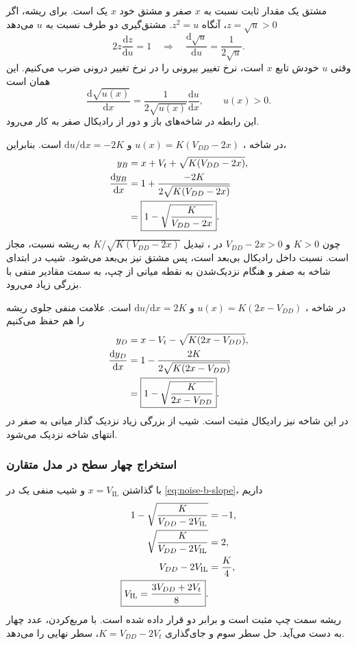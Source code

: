 مشتق یک مقدار ثابت نسبت به \(x\) صفر و مشتق خود \(x\) یک است.
برای ریشه، اگر \(z=\sqrt{u}>0\)، آنگاه \(z^2=u\).
مشتق‌گیری دو طرف نسبت به \(u\) می‌دهد
\[
 2z\frac{\mathrm{d}z}{\mathrm{d}u}=1
 \quad\Longrightarrow\quad
 \frac{\mathrm{d}\sqrt{u}}{\mathrm{d}u}=\frac{1}{2\sqrt{u}}.
\]
وقتی \(u\) خودش تابع \(x\) است، نرخ تغییر بیرونی را در نرخ
تغییر درونی ضرب می‌کنیم. این همان  است
\begin{equation}
 \frac{\mathrm{d}\sqrt{u(x)}}{\mathrm{d}x}
 =\frac{1}{2\sqrt{u(x)}}\frac{\mathrm{d}u}{\mathrm{d}x},
 \qquad u(x)>0.
 \label{eq:noise-chain-rule}
\end{equation}
این رابطه در شاخه‌های باز و دور از رادیکال صفر به کار می‌رود.

در شاخه ، \(u(x)=K(V_{DD}-2x)\) و
\(\mathrm{d}u/\mathrm{d}x=-2K\) است. بنابراین،
\begin{align}
 y_B&=x+V_t+\sqrt{K(V_{DD}-2x)},\notag\\
 \frac{\mathrm{d}y_B}{\mathrm{d}x}
 &=1+\frac{-2K}{2\sqrt{K(V_{DD}-2x)}}\notag\\
 &=\boxed{1-\sqrt{\frac{K}{V_{DD}-2x}}}.
 \label{eq:noise-b-slope}
\end{align}
چون \(K>0\) و \(V_{DD}-2x>0\) در ، تبدیل
\(K/\sqrt{K(V_{DD}-2x)}\) به ریشه نسبت، مجاز است.
نسبت داخل رادیکال بی‌بعد است، پس مشتق نیز بی‌بعد می‌شود.
شیب در ابتدای شاخه به صفر و هنگام نزدیک‌شدن به نقطه میانی
از چپ، به سمت مقادیر منفی با بزرگی زیاد می‌رود.

در شاخه ، \(u(x)=K(2x-V_{DD})\) و
\(\mathrm{d}u/\mathrm{d}x=2K\) است. علامت منفی جلوی ریشه را
هم حفظ می‌کنیم
\begin{align}
 y_D&=x-V_t-\sqrt{K(2x-V_{DD})},\notag\\
 \frac{\mathrm{d}y_D}{\mathrm{d}x}
 &=1-\frac{2K}{2\sqrt{K(2x-V_{DD})}}\notag\\
 &=\boxed{1-\sqrt{\frac{K}{2x-V_{DD}}}}.
 \label{eq:noise-d-slope}
\end{align}
در این شاخه نیز رادیکال مثبت است. شیب از بزرگی زیاد نزدیک
گذار میانی به صفر در انتهای شاخه نزدیک می‌شود.

\subsubsection{استخراج چهار سطح در مدل متقارن}
\label{sec:noise-symmetric-levels}
با گذاشتن \(x=V_{\mathrm{IL}}\) و شیب منفی یک در
\eqref{eq:noise-b-slope}، داریم
\begin{align}
 1-\sqrt{\frac{K}{V_{DD}-2V_{\mathrm{IL}}}}&=-1,\notag\\
 \sqrt{\frac{K}{V_{DD}-2V_{\mathrm{IL}}}}&=2,\notag\\
 V_{DD}-2V_{\mathrm{IL}}&=\frac{K}{4},\notag\\
 \boxed{V_{\mathrm{IL}}=\frac{3V_{DD}+2V_t}{8}}.
 \label{eq:noise-vil}
\end{align}
ریشه سمت چپ مثبت است و برابر دو قرار داده شده است. با
مربع‌کردن، عدد چهار به دست می‌آید. حل سطر سوم و جای‌گذاری
\(K=V_{DD}-2V_t\)، سطر نهایی را می‌دهد.


